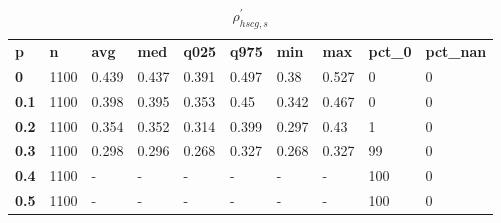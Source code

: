 \begin{table}[h]
 \centering 
\footnotesize
\caption{$\rho_{hscg,s}^\prime $}
\label{tab:alphahscgs}
\begin{tabular}[h]{| l l l l l l l l l l|
    } \hline
\textbf{ p} & \textbf{ n} & \textbf{ avg} & \textbf{ med} & \textbf{ q025} & \textbf{ q975} & \textbf{ min} & \textbf{ max} & \textbf{ pct\_0} & \textbf{ pct\_nan}
           \\
  \textbf{  0} & 1100 & 0.439 & 0.437 & 0.391 & 0.497 &  0.38 & 0.527 &   0 & 0
           \\
  \textbf{0.1} & 1100 & 0.398 & 0.395 & 0.353 &  0.45 & 0.342 & 0.467 &   0 & 0
           \\
  \textbf{0.2} & 1100 & 0.354 & 0.352 & 0.314 & 0.399 & 0.297 &  0.43 &   1 & 0
           \\
  \textbf{0.3} & 1100 & 0.298 & 0.296 & 0.268 & 0.327 & 0.268 & 0.327 &  99 & 0
           \\
  \textbf{0.4} & 1100 & - & - & - & - & - & - & 100 & 0
           \\
  \textbf{0.5} & 1100 & - & - & - & - & - & - & 100 & 0
           \\
 \hline \end{tabular}
 \end{table}
